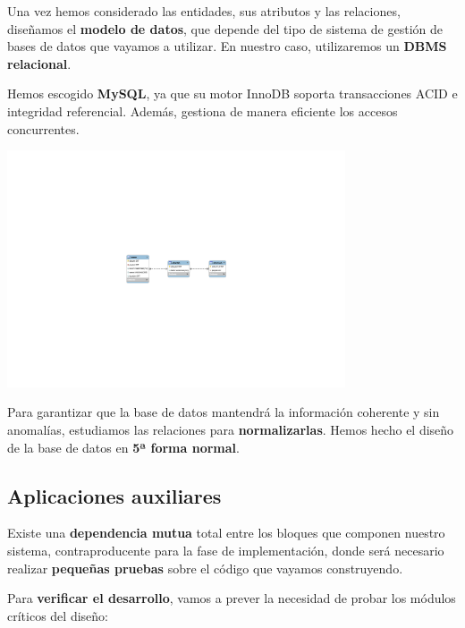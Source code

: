 \documentclass[10pt,a4paper]{article}
\begin{document}
	Una vez hemos considerado las entidades, sus atributos y las relaciones, diseñamos el \textbf{modelo de datos}, que depende del tipo de sistema de gestión de bases de datos que vayamos a utilizar. En nuestro caso, utilizaremos un \textbf{DBMS relacional}.
	
	Hemos escogido \textbf{MySQL}, ya que su motor InnoDB soporta transacciones ACID e integridad referencial. Además, gestiona de manera eficiente los accesos concurrentes.
	
	\begin{center}
		\includegraphics[width=0.75\textwidth]{images/bd_rel} 
	\end{center}
	
	Para garantizar que la base de datos mantendrá la información coherente y sin anomalías, estudiamos las relaciones para \textbf{normalizarlas}. Hemos hecho el diseño de la base de datos en \textbf{5ª forma normal}.
	
	\subsection{Aplicaciones auxiliares}
	
	Existe una \textbf{dependencia mutua} total entre los bloques que componen nuestro sistema, contraproducente para la fase de implementación, donde será necesario realizar \textbf{pequeñas pruebas} sobre el código que vayamos construyendo.
	
	Para \textbf{verificar el desarrollo}, vamos a prever la necesidad de probar los módulos críticos del diseño:
	
\end{document}
